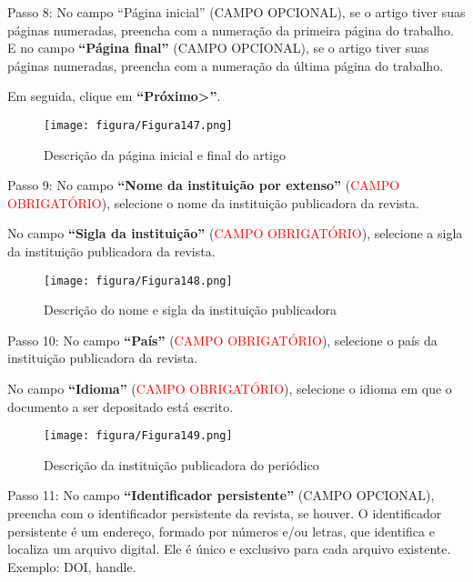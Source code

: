 \documentclass[12pt,hidelinks]{article}
\begin{document}
    Passo 8: No campo “Página inicial” (\textcolor{applegreen}{CAMPO OPCIONAL}), se o artigo tiver suas páginas numeradas, preencha com a numeração da primeira página do trabalho. E no campo \textbf{“Página final”} (\textcolor{applegreen}{CAMPO OPCIONAL}), se o artigo tiver suas páginas numeradas, preencha com a numeração da última página do trabalho.
    
    Em seguida, clique em \textbf{“Próximo>”}.
    
    \begin{figure}[!htp]
                \centering
                \texttt{[image: figura/Figura147.png]}
                \caption{Descrição da página inicial e final do artigo}
            \label{Rotulo}
        \end{figure}
    
    Passo 9: No campo \textbf{“Nome da instituição por extenso”} (\textcolor{red}{CAMPO OBRIGATÓRIO}), selecione o nome da instituição publicadora da revista.
    
\newpage
    
    No campo \textbf{“Sigla da instituição”} (\textcolor{red}{CAMPO OBRIGATÓRIO}), selecione a sigla da instituição publicadora da revista.
    
    \begin{figure}[!htp]
                \centering
                \texttt{[image: figura/Figura148.png]}
                \caption{Descrição do nome e sigla da instituição publicadora}
            \label{Rotulo}
        \end{figure}
    
    Passo 10: No campo \textbf{“País”} (\textcolor{red}{CAMPO OBRIGATÓRIO}), selecione o país da instituição publicadora da revista.
    
    \singlespacing
    
    No campo \textbf{“Idioma”} (\textcolor{red}{CAMPO OBRIGATÓRIO}), selecione o idioma em que o documento a ser depositado está escrito.
    
    \begin{figure}[!htp]
                \centering
                \texttt{[image: figura/Figura149.png]}
                \caption{Descrição da instituição publicadora do periódico}
            \label{Rotulo}
        \end{figure}
    
    Passo 11: No campo \textbf{“Identificador persistente”} (\textcolor{applegreen}{CAMPO OPCIONAL}), preencha com o identificador persistente da revista, se houver. O identificador persistente é um endereço, formado por números e/ou letras, que identifica e localiza um arquivo digital. Ele é único e exclusivo para cada arquivo existente. Exemplo: DOI, handle.
\end{document}
